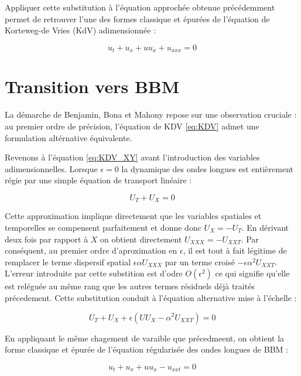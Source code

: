 Appliquer cette substitution à l'équation approchée obtenue précédemment permet de retrouver l'une des formes classique et épurées de l'équation de Korteweg-de Vries (KdV) adimensionnée :

\begin{equation}\label{eq:KDV}
    u_t + u_x + u u_x + u_{xxx} = 0
\end{equation}




\section{Transition vers BBM}

La démarche de Benjamin, Bona et Mahony repose sur une observation cruciale : au premier ordre de précision, l'équation de KDV \eqref{eq:KDV} admet une formulation altérnative équivalente.

Revenons à l'équation \eqref{eq:KDV_XY} avant l'introduction des variables adimensionnelles. Lorsque $\epsilon=0$ la dynamique des ondes longues est entièrement régie par une simple équation de transport linéaire :

\begin{equation}
    U_T + U_X = 0
\end{equation}

Cette approximation implique directement que les variables spatiales et temporelles se compensent parfaitement et donne donc $U_X = -U_T$. En dérivant deux fois par rapport à $X$ on obtient directement $U_{XXX} = -U_{XXT}$.
Par conséquent, au premier ordre d'aproximation en $\epsilon$, il est tout à fait légitime de remplacer le terme dispersif spatial $\epsilon \alpha U_{XXX}$ par un terme croisé $-\epsilon \alpha^2 U_{XXT}$. L'erreur introduite par cette substition est d'odre $O(\epsilon^2)$ ce qui signifie qu'elle est reléguée au même rang que les autres termes résiduels déjà traités précedement. Cette substitution conduit à l'équation alternative mise à l'échelle :

\begin{equation}
    U_T + U_X + \epsilon(UU_X - \alpha^2 U_{XXT}) = 0
\end{equation}

En appliquant le même chagement de varaible que précedmeent, on obtient la forme classique et épurée de l'équation régularisée des ondes longues de BBM :

\begin{equation}\label{eq:BBM}
    u_t + u_x + uu_x - u_{xxt} = 0
\end{equation}









